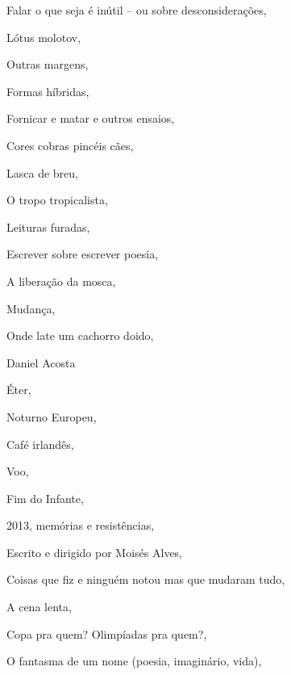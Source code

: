 \begin{multicols}{2}
\begin{enumerate}
{\item Falar o que seja é inútil – ou sobre desconsiderações, {}
\item Lótus molotov, {}
\item Outras margens, {}
\item Formas híbridas, {}
\item Fornicar e matar e outros ensaios, {}
\item Cores cobras pincéis cães, {}
\item Lasca de breu, {}
\item O tropo tropicalista, {}
\item Leituras furadas, {}
\item Escrever sobre escrever poesia, {}
\item A liberação da mosca, {}
\item Mudança, {}
\item Onde late um cachorro doido, {}
\item Daniel Acosta
\item Éter, {}
\item Noturno Europeu, {}
\item Café irlandês, {}
\item Voo, {}
\item Fim do Infante, {}
\item 2013, memórias e resistências, {}
\item Escrito e dirigido por Moisés Alves, {}
\item Coisas que fiz e ninguém notou mas que mudaram tudo, {}
\item A cena lenta, {}
\item Copa pra quem? Olimpíadas pra quem?, {}
\item O fantasma de um nome (poesia, imaginário, vida), {}
}
\end{enumerate}
\end{multicols}
